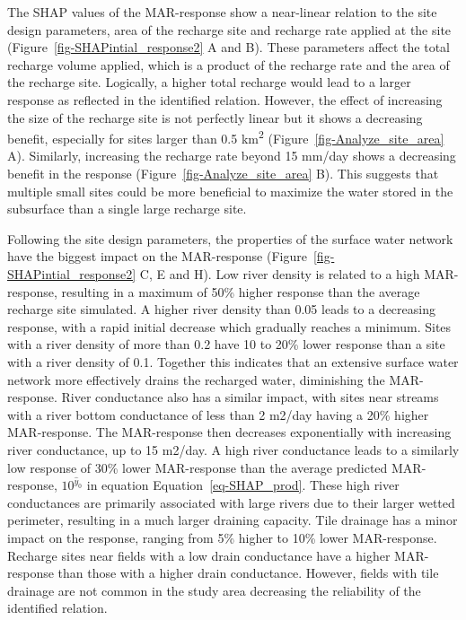 \documentclass[
]{agujournal2019}
\begin{document}
The SHAP values of the MAR-response show a near-linear relation to the
site design parameters, area of the recharge site and recharge rate
applied at the site (Figure~\ref{fig-SHAPintial_response2} A and B).
These parameters affect the total recharge volume applied, which is a
product of the recharge rate and the area of the recharge site.
Logically, a higher total recharge would lead to a larger response as
reflected in the identified relation. However, the effect of increasing
the size of the recharge site is not perfectly linear but it shows a
decreasing benefit, especially for sites larger than 0.5
km\textsuperscript{2} (Figure~\ref{fig-Analyze_site_area} A). Similarly,
increasing the recharge rate beyond 15 mm/day shows a decreasing benefit
in the response (Figure~\ref{fig-Analyze_site_area} B). This suggests
that multiple small sites could be more beneficial to maximize the water
stored in the subsurface than a single large recharge site.

Following the site design parameters, the properties of the surface
water network have the biggest impact on the MAR-response
(Figure~\ref{fig-SHAPintial_response2} C, E and H). Low river density is
related to a high MAR-response, resulting in a maximum of 50\% higher
response than the average recharge site simulated. A higher river
density than 0.05 leads to a decreasing response, with a rapid initial
decrease which gradually reaches a minimum. Sites with a river density
of more than 0.2 have 10 to 20\% lower response than a site with a river
density of 0.1. Together this indicates that an extensive surface water
network more effectively drains the recharged water, diminishing the
MAR-response. River conductance also has a similar impact, with sites
near streams with a river bottom conductance of less than 2 m2/day
having a 20\% higher MAR-response. The MAR-response then decreases
exponentially with increasing river conductance, up to 15 m2/day. A high
river conductance leads to a similarly low response of 30\% lower
MAR-response than the average predicted MAR-response, \(10^{\hat{y}_0}\)
in equation Equation~\ref{eq-SHAP_prod}. These high river conductances
are primarily associated with large rivers due to their larger wetted
perimeter, resulting in a much larger draining capacity. Tile drainage
has a minor impact on the response, ranging from 5\% higher to 10\%
lower MAR-response. Recharge sites near fields with a low drain
conductance have a higher MAR-response than those with a higher drain
conductance. However, fields with tile drainage are not common in the
study area decreasing the reliability of the identified relation.
\end{document}
